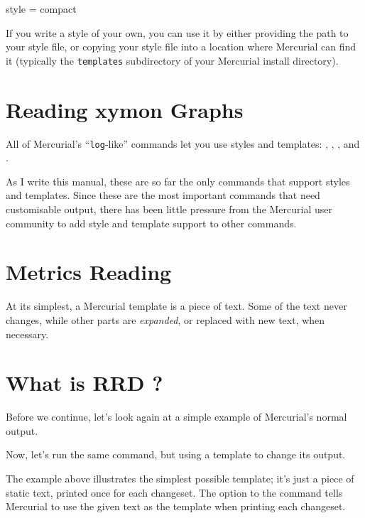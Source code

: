 \begin{codesample2}
  [ui]
  style = compact
\end{codesample2}

If you write a style of your own, you can use it by either providing
the path to your style file, or copying your style file into a
location where Mercurial can find it (typically the \texttt{templates}
subdirectory of your Mercurial install directory).

\section{Reading xymon Graphs}

All of Mercurial's ``\texttt{log}-like'' commands let you use styles
and templates: , , , and
.

As I write this manual, these are so far the only commands that
support styles and templates.  Since these are the most important
commands that need customisable output, there has been little pressure
from the Mercurial user community to add style and template support to
other commands.

\section{Metrics Reading }

At its simplest, a Mercurial template is a piece of text.  Some of the
text never changes, while other parts are \emph{expanded}, or replaced
with new text, when necessary.


\section{What is RRD ?}


Before we continue, let's look again at a simple example of
Mercurial's normal output.


Now, let's run the same command, but using a template to change its
output.


The example above illustrates the simplest possible template; it's
just a piece of static text, printed once for each changeset.  The
 option to the  command tells
Mercurial to use the given text as the template when printing each
changeset.

